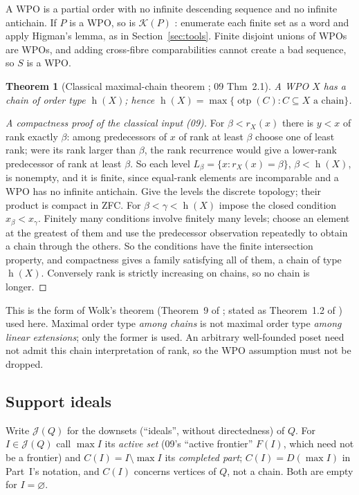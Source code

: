 \documentclass[11pt,a4paper]{article}
\newtheorem{theorem}{Theorem}[section]
\theoremstyle{definition}
\theoremstyle{remark}
\newcommand{\K}{\mathcal K}
\newcommand{\hgt}{\operatorname{h}}
\newcommand{\J}{\mathcal J}
\newcommand{\otp}{\operatorname{otp}}
\begin{document}
A WPO is a partial order with no infinite descending sequence and no infinite
antichain. If $P$ is a WPO, so is $\K(P)$ \cite{AbriolaEtAl2024}: enumerate each
finite set as a word and apply Higman's lemma, as in Section~\ref{sec:tools}.
Finite disjoint unions of WPOs are WPOs, and adding cross-fibre comparabilities
cannot create a bad sequence, so $S$ is a WPO.

\begin{theorem}[Classical maximal-chain theorem \cite{Wolk1967,MMS2012}; 09 Thm~2.1]
\label{nh:wpo:thm:wolk}
A WPO $X$ has a chain of order type $\hgt(X)$; hence
$\hgt(X)=\max\{\otp(C):C\subseteq X\text{ a chain}\}$.
\end{theorem}
\begin{proof}[A compactness proof of the classical input (09)]
For $\beta<r_X(x)$ there is $y<x$ of rank exactly $\beta$: among predecessors
of $x$ of rank at least $\beta$ choose one of least rank; were its rank larger
than $\beta$, the rank recurrence would give a lower-rank predecessor of rank at
least $\beta$. So each level $L_\beta=\{x:r_X(x)=\beta\}$, $\beta<\hgt(X)$, is
nonempty, and it is finite, since equal-rank elements are incomparable and a
WPO has no infinite antichain. Give the levels the discrete topology; their
product is compact in ZFC. For $\beta<\gamma<\hgt(X)$ impose the closed
condition $x_\beta<x_\gamma$. Finitely many conditions involve finitely many
levels; choose an element at the greatest of them and use the predecessor
observation repeatedly to obtain a chain through the others. So the conditions
have the finite intersection property, and compactness gives a family
satisfying all of them, a chain of type $\hgt(X)$. Conversely rank is strictly
increasing on chains, so no chain is longer.
\end{proof}

This is the form of Wolk's theorem (Theorem~9 of \cite{Wolk1967}; stated as
Theorem~1.2 of \cite{MMS2012}) used here. Maximal order type \emph{among
chains} is not maximal order type \emph{among linear extensions}; only the
former is used. An arbitrary well-founded poset need not admit this chain
interpretation of rank, so the WPO assumption must not be dropped.

\subsection{Support ideals}

Write $\J(Q)$ for the downsets (``ideals'', without directedness) of $Q$. For
$I\in\J(Q)$ call $\max I$ its \emph{active set} (09's ``active frontier''
$F(I)$, which need not be a frontier) and $C(I)=I\setminus\max I$ its
\emph{completed part}; $C(I)=D(\max I)$ in Part~I's notation, and $C(I)$ concerns
vertices of $Q$, not a chain. Both are empty for $I=\varnothing$.
\end{document}
